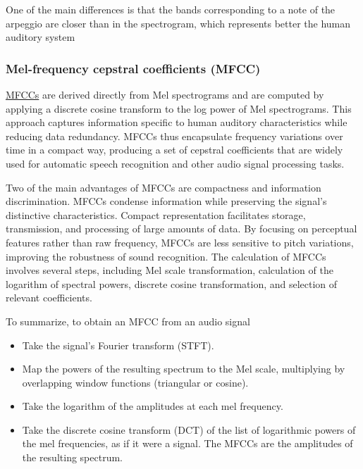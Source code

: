 \documentclass[11pt]{article}
\begin{document}
One of the main differences is that the bands corresponding to a note of the arpeggio are closer than in the spectrogram, which represents better the human auditory system


\subsubsection{Mel-frequency cepstral coefficients (MFCC)}

\href{https://en.wikipedia.org/wiki/Mel-frequency_cepstrum}{MFCCs} are derived directly from Mel spectrograms and are computed by applying a discrete cosine transform to the log power of Mel spectrograms. This approach captures information specific to human auditory characteristics while reducing data redundancy. MFCCs thus encapsulate frequency variations over time in a compact way, producing a set of cepstral coefficients that are widely used for automatic speech recognition and other audio signal processing tasks.

Two of the main advantages of MFCCs are compactness and information discrimination. MFCCs condense information while preserving the signal's distinctive characteristics. Compact representation facilitates storage, transmission, and processing of large amounts of data.
By focusing on perceptual features rather than raw frequency, MFCCs are less sensitive to pitch variations, improving the robustness of sound recognition.
The calculation of MFCCs involves several steps, including Mel scale transformation, calculation of the logarithm of spectral powers, discrete cosine transformation, and selection of relevant coefficients.


To summarize, to obtain an MFCC from an audio signal

\begin{itemize}
  \item Take the signal's Fourier transform (STFT).
  \item Map the powers of the resulting spectrum to the Mel scale, multiplying by overlapping window functions (triangular or cosine).
  \item Take the logarithm of the amplitudes at each mel frequency.
  \item Take the discrete cosine transform (DCT) of the list of logarithmic powers of the mel frequencies, as if it were a signal. The MFCCs are the amplitudes of the resulting spectrum.
\end{itemize}
\end{document}
